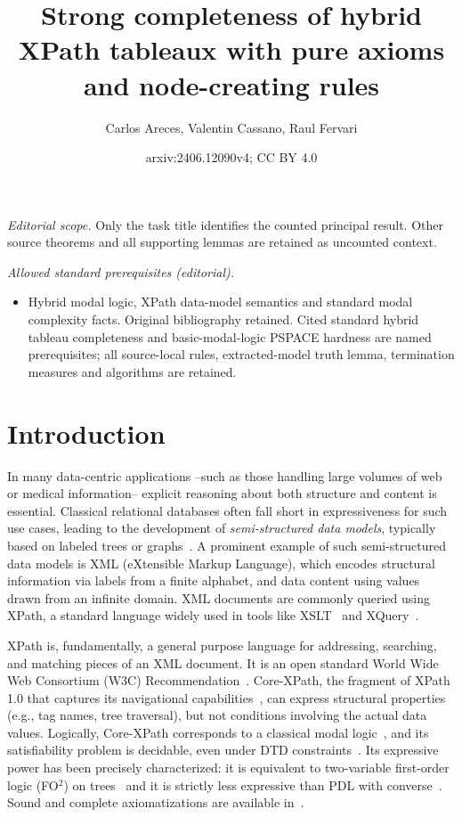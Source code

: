\documentclass[10pt,a4paper]{amsart}
\title{Strong completeness of hybrid XPath tableaux with pure axioms and node-creating rules}
\author{Carlos Areces, Valentin Cassano, Raul Fervari}
\date{arxiv:2406.12090v4; CC BY 4.0}
\theoremstyle{definition}
\theoremstyle{remark}
\begin{document}
\maketitle
\noindent\textit{Editorial scope.} Only the task title identifies the counted principal result. Other source theorems and all supporting lemmas are retained as uncounted context.\par\medskip
\noindent\textit{Allowed standard prerequisites (editorial).}\begin{itemize}
\item Hybrid modal logic, XPath data-model semantics and standard modal complexity facts. Original bibliography retained. Cited standard hybrid tableau completeness and basic-modal-logic PSPACE hardness are named prerequisites; all source-local rules, extracted-model truth lemma, termination measures and algorithms are retained.
\end{itemize}\medskip
\section{Introduction}
\label{sec:intro}


In many data-centric applications --such as those handling large volumes of web or medical information-- explicit reasoning about both structure and content is essential. Classical relational databases often fall short in expressiveness for such use cases, leading to the development of \emph{semi-structured data models}, typically based on labeled trees or graphs~\cite{Bune:semi97,Abit:data99}. A prominent example of such semi-structured data models is XML (eXtensible Markup Language), which encodes structural information via labels from a finite alphabet, and data content using values drawn from an infinite domain. XML documents are commonly queried using XPath, a standard language widely used in tools like XSLT~\cite{xslt:w3c} and XQuery~\cite{xquery:w3c}.  

XPath is, fundamentally, a general purpose language for
addressing, searching, and matching pieces of an XML document. It is an open standard
World Wide Web Consortium (W3C) Recommendation~\cite{xpath:w3c}.
Core-XPath, the fragment of XPath 1.0 that captures its navigational capabilities~\cite{GKP05}, can express structural properties (e.g., tag names, tree traversal), but not conditions involving the actual data values. Logically, Core-XPath corresponds to a classical modal logic~\cite{blackburn2001modal,blackburn06}, and its satisfiability problem is decidable, even under DTD constraints~\cite{M04,BFG08}. Its expressive power has been precisely characterized: it is equivalent to two-variable first-order logic (FO$^2$) on trees~\cite{MdR05} and it is strictly less expressive than PDL with converse~\cite{BK08}. Sound and complete axiomatizations are available in~\cite{CateM09,cateLM10}.
\end{document}
